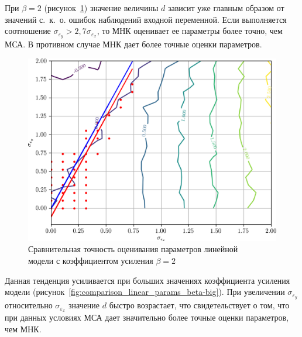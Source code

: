 \pagebreak
При \( \beta = 2 \) (рисунок~\ref{fig:comparison_linear_params_beta-2})
значение величины \( d \) зависит уже главным образом от значений с.~к.~о. ошибок
наблюдений входной переменной.
Если выполняется соотношение \( \sigma_{\varepsilon_y} > 2{,}7 \sigma_{\varepsilon_x} \),
то МНК оценивает ее параметры более точно, чем МСА.
В противном случае МНК дает более точные оценки параметров.

\begin{figure}[h]
  \centering
  \includegraphics[width=135mm]{fig/linear/param/beta-2_param-accs-approx.png}
  \caption{%
    Сравнительная точность оценивания параметров линейной \\
    модели с коэффициентом усиления \( \beta = 2 \)
  }\label{fig:comparison_linear_params_beta-2}
\end{figure}

Данная тенденция усиливается при больших значениях коэффициента усиления модели
(рисунок~\ref{fig:comparison_linear_params_beta-big}).
При увеличении \( \sigma_{\varepsilon_y} \) относительно \( \sigma_{\varepsilon_x} \) значение
\( d \) быстро возрастает, что свидетельствует о том,
что при данных условиях МСА дает значительно более точные оценки параметров, чем МНК.


